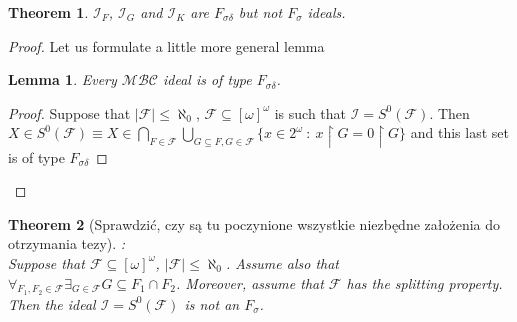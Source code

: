 \documentclass{amsart}
\newtheorem{thm}{Theorem}
\newtheorem{lem}{Lemma}
\theoremstyle{definition}
\theoremstyle{definition}
\newcommand{\N}{{\mathbb N}}
\newcommand{\I}{\mathcal I}
\newcommand{\MB}{S^0}  %
\newcommand{\MBC}{\mathcal{MBC}}
\begin{document}
\begin{thm}
$\I_F$, $\I_G$ and $\I_K$ are $F_{\sigma\delta}$ but not $F_{\sigma}$ ideals.
\end{thm}

\begin{proof}
Let us formulate a little more general lemma
\begin{lem}
Every $\MBC$ ideal is of type $F_{\sigma\delta}$.
\end{lem}
\begin{proof}
Suppose that $|\mathcal{F}|\leq\aleph_0$, $\mathcal{F}\subseteq [\omega]^\omega$ is such that $\I = \MB(\mathcal{F})$.
Then $X\in \MB(\mathcal{F}) \equiv X\in \bigcap_{F\in\mathcal{F}} \bigcup_{G\subseteq F, G\in\mathcal{F}} \{x\in 2^\omega\ :\ x\upharpoonright G = 0\upharpoonright G\}$ 
and this last set is of type $F_{\sigma\delta}$
\end{proof}
\end{proof}

\begin{thm}
[Sprawdzić, czy są tu poczynione wszystkie niezbędne założenia do otrzymania tezy]:\\
Suppose that $\mathcal{F}\subseteq [\omega]^\omega$,
$|\mathcal{F}|\leq\aleph_0$. 
Assume also that
$\forall_{F_1, F_2 \in \mathcal{F}} \exists_{G \in \mathcal{F}} G \subseteq F_1 \cap F_2$.
Moreover, assume that $\mathcal{F}$ has the splitting property. 
Then the ideal $\I =  \MB(\mathcal{F})$ 
is not an $F_{\sigma}$.
\end{thm}

\end{document}
